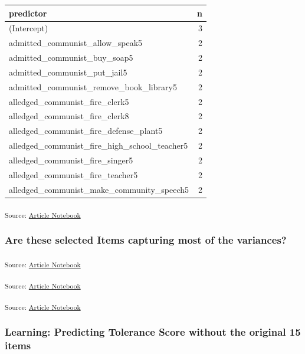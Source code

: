\documentclass[
  letterpaper,
  DIV=11,
  numbers=noendperiod]{scrartcl}
\begin{document}
\begin{longtable}[]{@{}lr@{}}
\toprule\noalign{}
predictor & n \\
\midrule\noalign{}
\endhead
\bottomrule\noalign{}
\endlastfoot
(Intercept) & 3 \\
admitted\_communist\_allow\_speak5 & 2 \\
admitted\_communist\_buy\_soap5 & 2 \\
admitted\_communist\_put\_jail5 & 2 \\
admitted\_communist\_remove\_book\_library5 & 2 \\
alledged\_communist\_fire\_clerk5 & 2 \\
alledged\_communist\_fire\_clerk8 & 2 \\
alledged\_communist\_fire\_defense\_plant5 & 2 \\
alledged\_communist\_fire\_high\_school\_teacher5 & 2 \\
alledged\_communist\_fire\_singer5 & 2 \\
alledged\_communist\_fire\_teacher5 & 2 \\
alledged\_communist\_make\_community\_speech5 & 2 \\
\end{longtable}

\textsubscript{Source:
\href{https://h-christy.github.io/data-ethics-final/index.qmd.html}{Article
Notebook}}

\subsubsection{Are these selected Items capturing most of the
variances?}\label{are-these-selected-items-capturing-most-of-the-variances}

\textsubscript{Source:
\href{https://h-christy.github.io/data-ethics-final/index.qmd.html}{Article
Notebook}}

\textsubscript{Source:
\href{https://h-christy.github.io/data-ethics-final/index.qmd.html}{Article
Notebook}}

\textsubscript{Source:
\href{https://h-christy.github.io/data-ethics-final/index.qmd.html}{Article
Notebook}}

\subsubsection{Learning: Predicting Tolerance Score without the original
15
items}\label{learning-predicting-tolerance-score-without-the-original-15-items}
\end{document}
